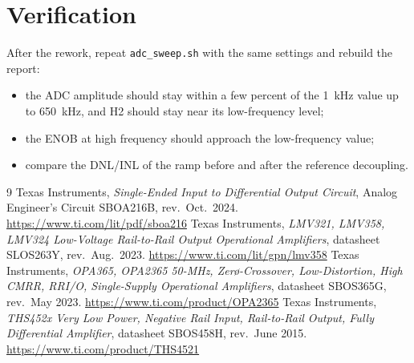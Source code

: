 \documentclass[10pt,a4paper]{article}
\begin{document}
\section{Verification}
After the rework, repeat \texttt{adc\_sweep.sh} with the same settings and rebuild the report:
\begin{itemize}
  \item the ADC amplitude should stay within a few percent of the \SI{1}{kHz} value up to
        \SI{650}{kHz}, and H2 should stay near its low-frequency level;
  \item the ENOB at high frequency should approach the low-frequency value;
  \item compare the DNL/INL of the ramp before and after the reference decoupling.
\end{itemize}

\begin{thebibliography}{9}
 Texas Instruments, \emph{Single-Ended Input to Differential Output Circuit},
  Analog Engineer's Circuit SBOA216B, rev.\ Oct.\ 2024. \url{https://www.ti.com/lit/pdf/sboa216}
 Texas Instruments, \emph{LMV321, LMV358, LMV324 Low-Voltage Rail-to-Rail Output
  Operational Amplifiers}, datasheet SLOS263Y, rev.\ Aug.\ 2023. \url{https://www.ti.com/lit/gpn/lmv358}
 Texas Instruments, \emph{OPA365, OPA2365 50-MHz, Zer\o-Crossover, Low-Distortion,
  High CMRR, RRI/O, Single-Supply Operational Amplifiers}, datasheet SBOS365G, rev.\ May 2023.
  \url{https://www.ti.com/product/OPA2365}
 Texas Instruments, \emph{THS452x Very Low Power, Negative Rail Input,
  Rail-to-Rail Output, Fully Differential Amplifier}, datasheet SBOS458H, rev.\ June 2015.
  \url{https://www.ti.com/product/THS4521}
\end{thebibliography}
\end{document}
